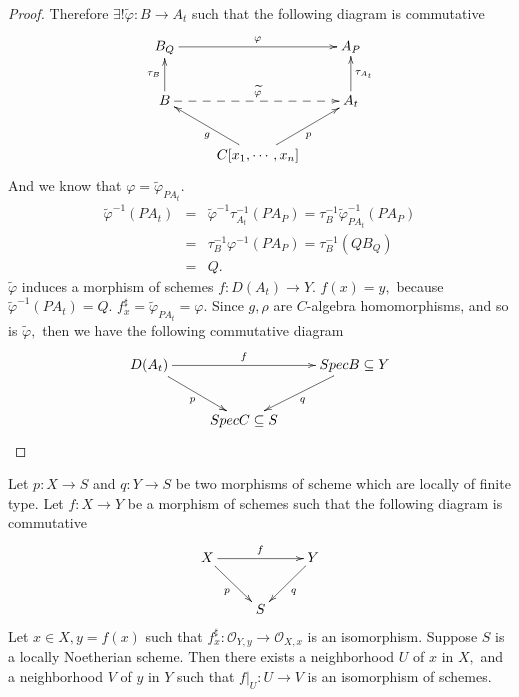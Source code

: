\begin{proof}
Therefore $\exists ! \widetilde{\varphi}: B\rightarrow A_t$ such
that the following diagram is commutative
\[ \xymatrix{
   B_Q \ar[rr]^{\varphi} & & A_P                                \\
   B \ar[u]^{\tau_B} \ar@{-->}[rr]^{\widetilde{\varphi}} & & A_t
   \ar[u]_{\tau_{A_t}}                                          \\
   & {C[x_1,\cdots,x_n]} \ar[ul]^g \ar[ur]_p }  \]
And we know that $\varphi=\widetilde{\varphi}_{PA_t}.$
\begin{eqnarray*}
\widetilde{\varphi}^{-1}(PA_t) & = &
\widetilde{\varphi}^{-1}\tau_{A_t}^{-1}(PA_P)=
\tau_B^{-1}\widetilde{\varphi}^{-1}_{PA_t}(PA_P)      \\
& = & \tau_B^{-1}\varphi^{-1}(PA_P)=\tau_B^{-1}(QB_Q) \\
& = & Q.
\end{eqnarray*}
$\widetilde{\varphi}$ induces a morphism of schemes $f:
D(A_t)\rightarrow Y.$ $f(x)=y,$ because
$\widetilde{\varphi}^{-1}(PA_t)=Q.$
$f^{\sharp}_x=\widetilde{\varphi}_{PA_t}=\varphi.$ Since $g,\rho$
are $C$-algebra homomorphisms, and so is $\widetilde{\varphi},$ then
we have the following commutative diagram
\[ \xymatrix{
   {D(A_t)} \ar[rr]^-{f} \ar[dr]_p & & {SpecB\subseteq Y}
   \ar[dl]^q                                           \\
   & {SpecC\subseteq S} }  \]
\end{proof}
\begin{prop}
Let $p: X\rightarrow S$ and $q: Y\rightarrow S$ be two morphisms of
scheme which are locally of finite type. Let $f: X\rightarrow Y$ be
a morphism of schemes such that the following diagram is commutative
\[ \xymatrix{
   X \ar[rr]^f \ar[dr]_p & & Y \ar[dl]^q \\
   & S }  \]
Let $x\in X, y=f(x)$ such that $f_x^{\sharp}:\mathcal
{O}_{Y,y}\rightarrow \mathcal {O}_{X,x}$ is an isomorphism. Suppose
$S$ is a locally Noetherian scheme. Then there exists a neighborhood
$U$ of $x$ in $X,$ and a neighborhood $V$ of $y$ in $Y$ such that
$\left.f\right|_U: U\rightarrow V$ is an isomorphism of schemes.
\end{prop}
